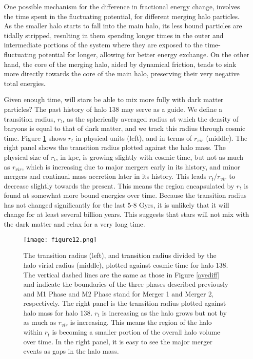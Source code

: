 \documentclass[a4paper,11pt]{article}
\begin{document}
One possible mechanism for the difference in fractional energy change, involves the time spent in the fluctuating potential, for different merging halo 
particles.  As the smaller halo starts to 
fall into the main halo, its less bound particles are tidally stripped, resulting in them spending longer times in the outer and intermediate portions of the 
system where they are exposed to the time-fluctuating potential for longer, allowing for better energy exchange.  On the other hand, the core of the merging 
halo, aided by dynamical friction, tends to sink more directly towards the core of the main halo, preserving their very negative total energies. 

Given enough time, will stars be able to mix more fully with dark matter particles?  The past history of halo 138 may
serve as a guide.  We define a transition radius, $r_t$, as the spherically averaged radius at which the
density of baryons is equal to that of dark matter, and we track this radius through
cosmic time. Figure \ref{rt3panel} shows $r_t$ in physical units (left), and in terms of $r_{vir}$ (middle). The right panel shows the transition radius 
plotted against the halo mass.  The physical size of $r_t$, in kpc, is growing slightly with cosmic time, but not as much as $r_{vir}$, which is increasing 
due to major mergers early in its history, and minor mergers and 
continual mass accretion later in its history.  This leads $r_t/r_{vir}$ to decrease slightly towards the present.  This 
means the region encapsulated by $r_t$ is found at somewhat more bound energies over time.  Because the transition radius has not changed significantly for 
the last 5-8 Gyrs, it is unlikely that it will change for at least several billion years.  This suggests that stars will not mix with the dark matter and 
relax for a very long time.  

\begin{figure}
\hskip -1.5cm
\texttt{[image: figure12.png]}
\caption{The transition radius (left), and transition radius divided by the halo virial radius (middle), plotted against cosmic time for halo 138.  The vertical 
dashed lines are the same as those in Figure \ref{avediff} and indicate the boundaries of the three phases described previously and M1 Phase and M2 Phase stand for Merger 1 and Merger 2, 
respectively.  The right panel is the 
transition radius plotted against halo mass for halo 138.  $r_t$ is increasing as the halo grows but not by as much as $r_{vir}$ is increasing.  This means 
the region of the halo within $r_t$ is becoming a smaller portion of the overall halo volume over time.  In the right panel, it is easy to see the major 
merger events as gaps in the halo mass.}
\label{rt3panel}
\end{figure} 
\end{document}
